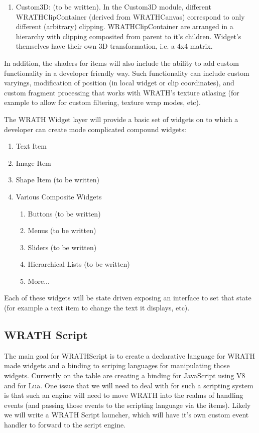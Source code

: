 \documentclass[a4paper,11pt]{article}
\begin{document}
\begin{indenter}{2cm}
\begin{indenter}{1cm}
\begin{enumerate}
\item Custom3D: (to be written). In the Custom3D module, different WRATHClipContainer (derived from WRATHCanvas) correspond to only different (arbitrary) clipping. WRATHClipContainer are arranged in a hierarchy with clipping composited from parent to it's children. Widget's themselves have their own 3D transformation, i.e. a 4x4 matrix.
\end{enumerate}
\end{indenter}

In addition, the shaders for items will also include the ability to add custom functionality in a developer friendly way. Such functionality can include custom varyings, modification of position (in local widget or clip coordinates), and custom fragment processing that works with WRATH's texture atlasing (for example to allow for custom filtering, texture wrap modes, etc).

The WRATH Widget layer will provide a basic set of widgets on to which a developer can create mode complicated compound widgets:

\begin{enumerate} 
\item Text Item
\item Image Item
\item Shape Item (to be written)
\item Various Composite Widgets
\begin{enumerate} 
\item Buttons (to be written)
\item Menus (to be written)
\item Sliders (to be written)
\item Hierarchical Lists (to be written)
\item More...
\end{enumerate} 
\end{enumerate} 

Each of these widgets will be state driven exposing an interface to set that state (for example a text item to change the text it displays, etc). 

\subsection{WRATH Script}
\begin{indenter}{1cm}
The main goal for WRATHScript is to create a declarative language for WRATH made widgets and a binding to scriping languages for manipulating those widgets. Currently on the table are creating a binding for JavaScript using V8 and for Lua. One issue that we will need to deal with for such a scripting system is that such an engine will need to move WRATH into the realms of handling events (and passing those events to the scripting language via the items). Likely we will write a WRATH Script launcher, which will have it's own custom event handler to forward to the script engine.


\end{indenter}
\end{indenter}
\end{document}
